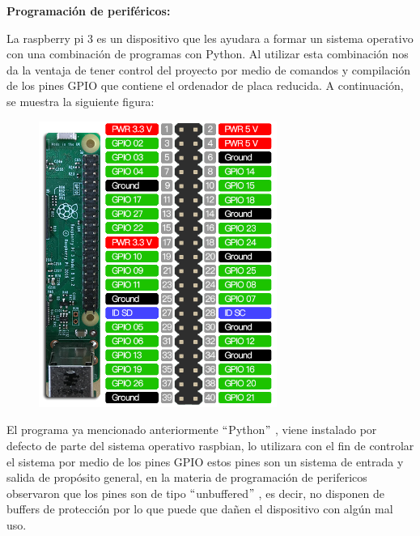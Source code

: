 \documentclass[12pt]{article}
\begin{document}
\vspace{\baselineskip}

\vspace{\baselineskip}

\vspace{\baselineskip}

\vspace{\baselineskip}

\vspace{\baselineskip}
\newpage
\textbf{Programación de periféricos:}\par








La raspberry pi 3 es un dispositivo que les ayudara a formar un sistema operativo con una combinación de programas con Python. Al utilizar esta combinación nos da la ventaja de tener control del proyecto por medio de comandos y compilación de los pines GPIO que contiene el ordenador de placa reducida. A continuación, se muestra la siguiente figura:

\begin{figure}[H]
\advance\leftskip 0.82in		\includegraphics[width=3.06in,height=3.68in]{./media/image5.png}
\end{figure}

\vspace{\baselineskip}
El programa ya mencionado anteriormente $``$Python$"$ , viene instalado por defecto de parte del sistema operativo raspbian, lo utilizara con el fin de controlar el sistema por medio de los pines GPIO estos pines son un sistema de entrada y salida de propósito general, en la materia de programación de perifericos observaron que los pines son de tipo $``$unbuffered$"$ , es decir, no disponen de buffers de protección por lo que puede que dañen el dispositivo con algún mal uso.\par
\end{document}
